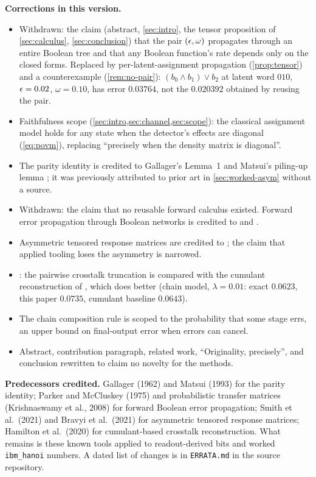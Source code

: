 \begin{center}
{\begin{minipage}{0.93\linewidth}
\textbf{Corrections in this version.}
\begin{itemize}\setlength{\itemsep}{1pt}\setlength{\parskip}{0pt}
\item Withdrawn: the claim (abstract, \cref{sec:intro}, the tensor proposition of
  \cref{sec:calculus}, \cref{sec:conclusion}) that the pair $(\epsilon,\omega)$ propagates through an entire
  Boolean tree and that any Boolean function's rate depends only on the closed
  forms. Replaced by per-latent-assignment propagation
  (\cref{prop:tensor}) and a counterexample (\cref{rem:no-pair}):
  $(b_0\wedge b_1)\vee b_2$ at latent word $010$, $\epsilon=0.02$, $\omega=0.10$,
  has error $0.03764$, not the $0.020392$ obtained by reusing the pair.
\item Faithfulness scope (\cref{sec:intro,sec:channel,sec:scope}): the classical assignment model holds
  for any state when the detector's effects are diagonal
  (\cref{eq:povm}), replacing ``precisely when the density matrix is
  diagonal''.
\item The parity identity is credited to Gallager's Lemma~1 and Matsui's
  piling-up lemma \citep{gallager1962ldpc,matsui1993linear}; it was previously
  attributed to prior art in \cref{sec:worked-asym} without a source.
\item Withdrawn: the claim that no reusable forward calculus existed. Forward
  error propagation through Boolean networks is credited to
  \citet{parker1975probabilistic} and \citet{krishnaswamy2008ptm}.
\item Asymmetric tensored response matrices are credited to
  \citet{smith2021bitflip}; the claim that applied tooling loses the
  asymmetry is narrowed.
\item {}: the pairwise crosstalk truncation is compared with the
  cumulant reconstruction of \citet{hamilton2020scalable}, which does better
  (chain model, $\lambda=0.01$: exact $0.0623$, this paper $0.0735$,
  cumulant baseline $0.0643$).
\item The chain composition rule is scoped to the probability that some stage
  errs, an upper bound on final-output error when errors can cancel.
\item Abstract, contribution paragraph, related work, ``Originality,
  precisely'', and conclusion rewritten to claim no novelty for the methods.
\end{itemize}

\textbf{Predecessors credited.} Gallager (1962) and Matsui (1993) for the
parity identity; Parker and McCluskey (1975) and probabilistic transfer
matrices (Krishnaswamy et al., 2008) for forward Boolean error propagation;
Smith et al.\ (2021) and Bravyi et al.\ (2021) for asymmetric tensored response
matrices; Hamilton et al.\ (2020) for cumulant-based crosstalk reconstruction.
What remains is these known tools applied to readout-derived bits and worked
\texttt{ibm\_hanoi} numbers. A dated list of changes is in
\texttt{ERRATA.md} in the source repository.
\end{minipage}}
\end{center}
\endgroup
